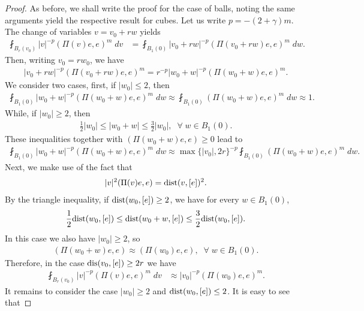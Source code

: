 \documentclass[12pt,american]{amsart}
\numberwithin{equation}{section}
\theoremstyle{plain}
\theoremstyle{definition}                  %
\begin{document}
\begin{proof}
  As before, we shall write the proof for the case of balls, noting the same arguments yield the respective result for cubes. Let us write $p=-(2+\gamma)m$. The change of variables $v=v_0+rw$ yields
  \begin{align*}
    \fint_{B_r(v_0)}|v|^{-p}(\Pi(v)e,e)^m\;dv & = \fint_{B_1(0)}|v_0+rw|^{-p}(\Pi(v_0+rw)e,e)^m\;dw. 
  \end{align*}	  
  Then, writing $v_0 = rw_0$, we have
  \begin{align*}
    |v_0+rw|^{-p}(\Pi(v_0+rw)e,e)^m = r^{-p} |w_0+w|^{-p}(\Pi(w_0+w)e,e)^m.	  
  \end{align*}	  
  We consider two cases, first, if $|w_0|\leq 2$, then
  \begin{align*}
    \fint_{B_1(0)}|w_0+w|^{-p}(\Pi(w_0+w)e,e)^m\;dw \approx \fint_{B_1(0)}(\Pi(w_0+w)e,e)^m\;dw \approx 1.
  \end{align*}	  
  While, if $|w_0|\geq 2$, then
  \begin{align*}
    \frac{1}{2}|w_0| \leq |w_0+w| \leq \frac{3}{2}|w_0|,\;\;\forall\;w\in B_1(0).	  
  \end{align*}	  
  These inequalities together with $(\Pi(w_0+w)e,e)\geq 0$ lead to 
  \begin{align*}
    \fint_{B_1(0)}|w_0+w|^{-p}(\Pi(w_0+w)e,e)^m\;dw \approx \max\{|v_0|,2r\}^{-p}\fint_{B_1(0)}(\Pi(w_0+w)e,e)^m\;dw.
  \end{align*}	  
  Next, we make use of the fact that
  \begin{align*}
    |v|^2(\Pi(v)e,e) = \textnormal{dist}(v, [e] )^2.
  \end{align*}
  By the triangle inequality, if $\textnormal{dist}(w_0,[e]) \geq 2$, we have for every $w\in B_1(0)$,
  \begin{align*}
    \frac{1}{2}\textnormal{dist}(w_0, [e] )\leq \textnormal{dist}(w_0+w, [e] )\leq \frac{3}{2}\textnormal{dist}(w_0, [e] ).
  \end{align*}
  In this case we also have $|w_0|\geq 2$, so
  \begin{align*}
    (\Pi(w_0+w)e,e) \approx (\Pi(w_0)e,e),\;\;\forall\;w\in B_1(0).
  \end{align*}
  Therefore, in the case $\textnormal{dis}(v_0,[e])\geq 2r$ we have
  \begin{align*}
    \fint_{B_r(v_0)}|v|^{-p}(\Pi(v)e,e)^m\;dv & \approx |v_0|^{-p}(\Pi(w_0)e,e)^m.
  \end{align*}	
  It remains to consider the case $|w_0|\geq 2$ and $\textnormal{dist}(w_0,[e])\leq 2$. It is easy to see that

\end{proof}
\end{document}
